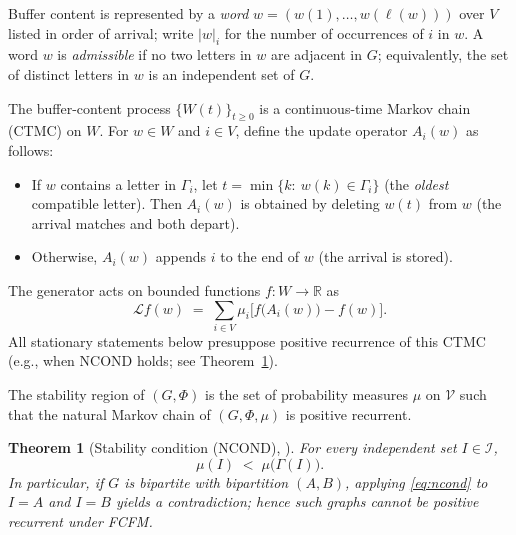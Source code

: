 \documentclass[11pt]{article}
\newtheorem{theorem}{Theorem}
\newcommand{\fcfm}{\textsc{FCFM}}
\begin{document}
Buffer content is represented by a \emph{word} $w=(w(1),\ldots,w(\ell(w)))$ over $V$ listed in order of arrival; write $|w|_i$ for the number of occurrences of $i$ in $w$.
A word $w$ is \emph{admissible} if no two letters in $w$ are adjacent in $G$; equivalently, the set of distinct letters in $w$ is an independent set of $G$.

The buffer-content process $\{W(t)\}_{t\ge0}$ is a continuous-time Markov chain (CTMC) on $W$.
For $w\in W$ and $i\in V$, define the update operator $A_i(w)$ as follows:
\begin{itemize}\itemsep0.2em
	\item If $w$ contains a letter in $\Gamma_i$, let $t=\min\{k:\ w(k)\in\Gamma_i\}$ (the \emph{oldest} compatible letter). Then $A_i(w)$ is obtained by deleting $w(t)$ from $w$ (the arrival matches and both depart).
	\item Otherwise, $A_i(w)$ appends $i$ to the end of $w$ (the arrival is stored).
\end{itemize}
The generator acts on bounded functions $f:W\to\mathbb{R}$ as
\[
\mathcal{L}f(w)\;=\;\sum_{i\in V}\mu_i\bigl[f\bigl(A_i(w)\bigr)-f(w)\bigr].
\]
All stationary statements below presuppose positive recurrence of this CTMC (e.g., when NCOND holds; see Theorem~\ref{thm:ncond}).

The stability region of $(G, \Phi)$ is the set of probability measures $\mu$ on $\mathcal{V}$ such that the natural Markov chain of $(G,\Phi,\mu)$ is positive recurrent.

\begin{theorem}[Stability condition (\textsc{NCOND}), {\cite[Thm.~2]{MaMo18}}]\label{thm:ncond}
	For every independent set $I\in\mathcal{I}$,
	\begin{equation}\label{eq:ncond}
		\mu(I)\;<\;\mu\!\bigl(\Gamma(I)\bigr).
	\end{equation}
	In particular, if $G$ is bipartite with bipartition $(A,B)$, applying \eqref{eq:ncond} to $I=A$ and $I=B$ yields a contradiction; hence such graphs cannot be positive recurrent under \fcfm.
\end{theorem}
\end{document}
